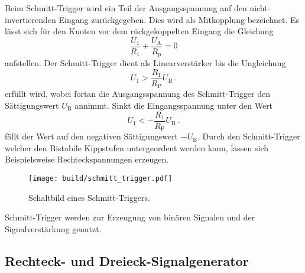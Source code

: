 Beim Schmitt-Trigger wird ein Teil der Ausgangsspannung auf den
nicht-invertierenden Eingang zurückgegeben.
Dies wird als Mitkopplung bezeichnet.
Es lässt sich für den Knoten vor dem rückgekoppelten Eingang die Gleichung
\begin{equation}
		\frac{U_1}{R_1} + \frac{U_\text{A}}{R_\text{p}} = 0
\end{equation}
aufstellen.
Der Schmitt-Trigger dient als Linearverstärker bis die Ungleichung
\begin{equation}
		\label{eq:schmitt}
		U_1 > \frac{R_1}{R_\text{P}} U_\text{B} \ .
\end{equation}
erfüllt wird, wobei fortan die Ausgangsspannung des Schmitt-Trigger den
Sättigungswert $U_\text{B}$ annimmt.
Sinkt die Eingangsspannung unter den Wert
\begin{equation}
		\label{eq:m_ub}
		U_1 < - \frac{R_1}{R_\text{P}} U_\text{B} \ .
\end{equation}
fällt der Wert auf den negativen Sättigungswert $-U_\text{B}$.
Durch den Schmitt-Trigger welcher den Bistabile Kippstufen untergeordent werden
kann, lassen sich Beispielsweise Rechteckspannungen erzeugen.
\begin{figure}[ht]
		\centering
		\texttt{[image: build/schmitt\_trigger.pdf]}
		\caption{Schaltbild eines Schmitt-Triggers. \cite{anleitung}}
    \label{fig:schmitt_theo}
\end{figure}
Schmitt-Trigger werden zur Erzeugung von binären Signalen und der
Signalverstärkung genutzt.

\subsection{Rechteck- und Dreieck-Signalgenerator}%
\label{sub:signalgenerator}

